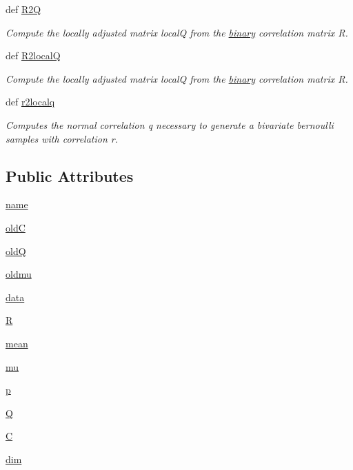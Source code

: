 \begin{CompactItemize}
def \hyperlink{classgen_1_1binary__mn_2e6f5771808178612aefbeebe6737f18}{R2Q}
\begin{CompactList}\small\item\em Compute the locally adjusted matrix localQ from the \hyperlink{classgen_1_1binary}{binary} correlation matrix R. \item\end{CompactList}\item 
def \hyperlink{classgen_1_1binary__mn_698853fe63226716476aa5a4bf9df76c}{R2localQ}
\begin{CompactList}\small\item\em Compute the locally adjusted matrix localQ from the \hyperlink{classgen_1_1binary}{binary} correlation matrix R. \item\end{CompactList}\item 
def \hyperlink{classgen_1_1binary__mn_f8d4b9ee7e9ed2ed06c4da3b2babaadf}{r2localq}
\begin{CompactList}\small\item\em Computes the normal correlation q necessary to generate a bivariate bernoulli samples with correlation r. \item\end{CompactList}\end{CompactItemize}
\subsection*{Public Attributes}
\begin{CompactItemize}
\item 
\hyperlink{classgen_1_1binary__mn_3a53b153bb420c5888eb0e65047bf3db}{name}
\item 
\hyperlink{classgen_1_1binary__mn_1df80ef0ecd8ba01ec9a6a2a460f46cc}{oldC}
\item 
\hyperlink{classgen_1_1binary__mn_60a38465bb9902b0fce51973efb4f65a}{oldQ}
\item 
\hyperlink{classgen_1_1binary__mn_bac8dcefdbdb3f0ec22628023041e779}{oldmu}
\item 
\hyperlink{classgen_1_1binary__mn_dc21a4441917a15c0336211938051cac}{data}
\item 
\hyperlink{classgen_1_1binary__mn_a3e93467420a3516765e31ecd164808f}{R}
\item 
\hyperlink{classgen_1_1binary__mn_eaff316a00faac4a925e5fc2a9ae8b59}{mean}
\item 
\hyperlink{classgen_1_1binary__mn_31f2c16e8843c761fbd4dcbd0d4237ed}{mu}
\item 
\hyperlink{classgen_1_1binary__mn_cb44e6b25ddd534c843734c4443c2f21}{p}
\item 
\hyperlink{classgen_1_1binary__mn_26e659ee26e9a63f034065231014f3a3}{Q}
\item 
\hyperlink{classgen_1_1binary__mn_30427a1bc1bbc9f50e67e20d763c9c1e}{C}
\item 
\hyperlink{classgen_1_1binary__mn_878160281d5c61d8de14db9ebc93f822}{dim}
\end{CompactItemize}
